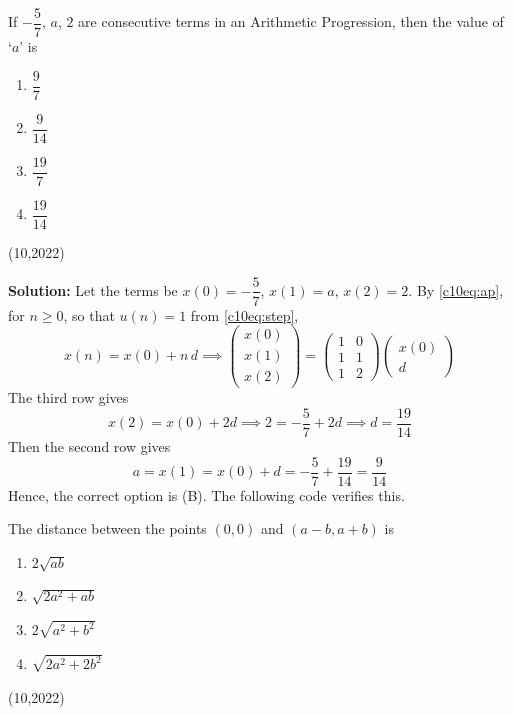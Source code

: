 \item If $-\dfrac{5}{7}$, $a$, $2$ are consecutive terms in an Arithmetic Progression, then the value of `$a$' is
\begin{enumerate}[label=(\Alph*), itemsep=3pt]
\item $\dfrac{9}{7}$
\item $\dfrac{9}{14}$
\item $\dfrac{19}{7}$
\item $\dfrac{19}{14}$
\end{enumerate}
\hfill (10,2022)

\textbf{Solution:} Let the terms be $x(0) = -\dfrac{5}{7}$, $x(1) = a$, $x(2) = 2$. By \eqref{c10eq:ap}, for $n \ge 0$, so that $u(n) = 1$ from \eqref{c10eq:step},
\begin{equation}
x(n) = x(0) + n\,d \implies
\begin{pmatrix} x(0) \\ x(1) \\ x(2) \end{pmatrix} = \begin{pmatrix} 1 & 0 \\ 1 & 1 \\ 1 & 2 \end{pmatrix}\begin{pmatrix} x(0) \\ d \end{pmatrix}
\end{equation}
The third row gives
\begin{equation}
x(2) = x(0) + 2d \implies 2 = -\frac{5}{7} + 2d \implies d = \frac{19}{14}
\end{equation}
Then the second row gives
\begin{equation}
a = x(1) = x(0) + d = -\frac{5}{7} + \frac{19}{14} = \frac{9}{14}
\end{equation}
Hence, the correct option is (B). The following code verifies this.

\nopagebreak[4]
\begin{center}
\end{center}


\item The distance between the points $(0, 0)$ and $(a - b, a + b)$ is
\begin{enumerate}[label=(\Alph*), itemsep=3pt]
\item $2\sqrt{ab}$
\item $\sqrt{2a^2 + ab}$
\item $2\sqrt{a^2 + b^2}$
\item $\sqrt{2a^2 + 2b^2}$
\end{enumerate}
\hfill (10,2022)

